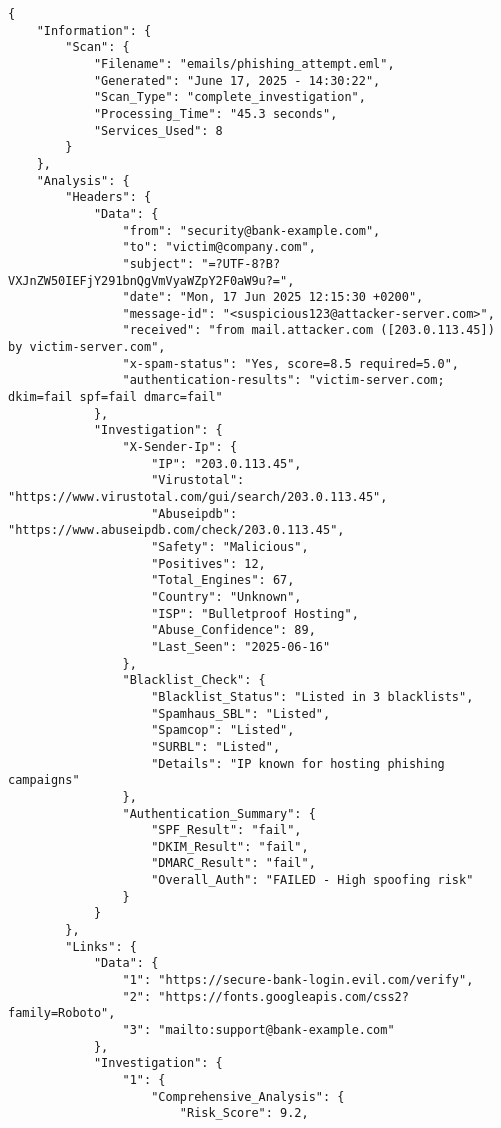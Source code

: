 \documentclass{article}
\begin{document}
\begin{lstlisting}[caption=Esempio output JSON dettagliato]
{
    "Information": {
        "Scan": {
            "Filename": "emails/phishing_attempt.eml",
            "Generated": "June 17, 2025 - 14:30:22",
            "Scan_Type": "complete_investigation",
            "Processing_Time": "45.3 seconds",
            "Services_Used": 8
        }
    },
    "Analysis": {
        "Headers": {
            "Data": {
                "from": "security@bank-example.com",
                "to": "victim@company.com", 
                "subject": "=?UTF-8?B?VXJnZW50IEFjY291bnQgVmVyaWZpY2F0aW9u?=",
                "date": "Mon, 17 Jun 2025 12:15:30 +0200",
                "message-id": "<suspicious123@attacker-server.com>",
                "received": "from mail.attacker.com ([203.0.113.45]) by victim-server.com",
                "x-spam-status": "Yes, score=8.5 required=5.0",
                "authentication-results": "victim-server.com; dkim=fail spf=fail dmarc=fail"
            },
            "Investigation": {
                "X-Sender-Ip": {
                    "IP": "203.0.113.45",
                    "Virustotal": "https://www.virustotal.com/gui/search/203.0.113.45",
                    "Abuseipdb": "https://www.abuseipdb.com/check/203.0.113.45",
                    "Safety": "Malicious",
                    "Positives": 12,
                    "Total_Engines": 67,
                    "Country": "Unknown",
                    "ISP": "Bulletproof Hosting",
                    "Abuse_Confidence": 89,
                    "Last_Seen": "2025-06-16"
                },
                "Blacklist_Check": {
                    "Blacklist_Status": "Listed in 3 blacklists",
                    "Spamhaus_SBL": "Listed",
                    "Spamcop": "Listed", 
                    "SURBL": "Listed",
                    "Details": "IP known for hosting phishing campaigns"
                },
                "Authentication_Summary": {
                    "SPF_Result": "fail",
                    "DKIM_Result": "fail", 
                    "DMARC_Result": "fail",
                    "Overall_Auth": "FAILED - High spoofing risk"
                }
            }
        },
        "Links": {
            "Data": {
                "1": "https://secure-bank-login.evil.com/verify",
                "2": "https://fonts.googleapis.com/css2?family=Roboto",
                "3": "mailto:support@bank-example.com"
            },
            "Investigation": {
                "1": {
                    "Comprehensive_Analysis": {
                        "Risk_Score": 9.2,

\end{lstlisting}
\end{document}
